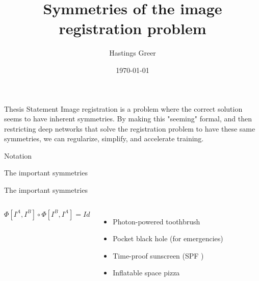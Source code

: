 \documentclass{beamer}
\title{Symmetries of the image registration problem}
\author{Hastings Greer}
\date{\today}
\begin{document}
\begin{frame}
    \titlepage
\end{frame}

\begin{frame}{Thesis Statement}
Image registration is a problem where the correct solution seems to have inherent symmetries. By making this "seeming" formal, and then restricting deep networks that solve the registration problem to have these same symmetries, we can regularize, simplify, and accelerate training. 
\end{frame}

\begin{frame}{Notation}
\end{frame}

\begin{frame}{The important symmetries}
\end{frame}


\begin{frame}{The important symmetries}
    \begin{columns}
            $\Phi[I^A, I^B] \circ \Phi[I^B, I^A] = Id$
        \begin{itemize}
            \item Photon-powered toothbrush
            \item Pocket black hole (for emergencies)
            \item Time-proof sunscreen (SPF )
            \item Inflatable space pizza
        \end{itemize}
    \end{columns}
\end{frame}
\end{document}
